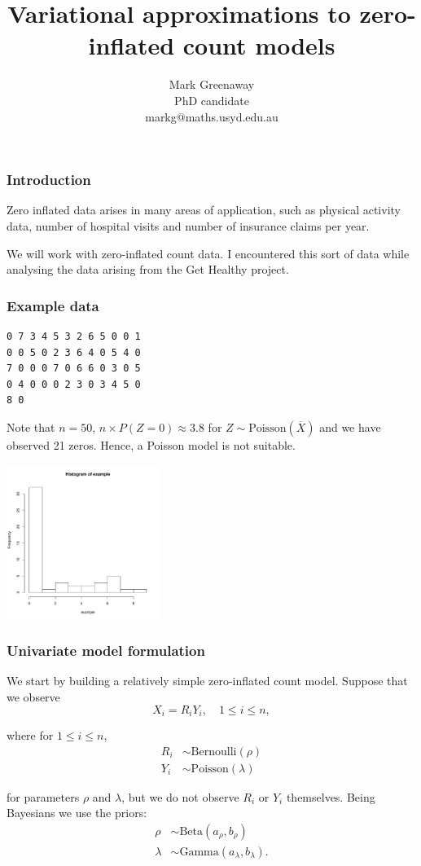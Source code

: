 \documentclass{beamer}
\title{Variational approximations to zero-inflated count models}
\author{Mark Greenaway\\PhD candidate\\markg@maths.usyd.edu.au}
\begin{document}
\begin{frame}
\titlepage
\end{frame}

\begin{frame}
\frametitle{Introduction}
Zero inflated data arises in many areas of application, such as physical
activity data, number of hospital visits and number of insurance claims per
year.

\bigskip 
We will work with zero-inflated count data. I encountered this sort of data while
analysing the data arising from the Get Healthy project.
\end{frame}

\begin{frame}[fragile]
\frametitle{Example data}
\begin{verbatim}
0 7 3 4 5 3 2 6 5 0 0 1
0 0 5 0 2 3 6 4 0 5 4 0
7 0 0 0 7 0 6 6 0 3 0 5
0 4 0 0 0 2 3 0 3 4 5 0
8 0
\end{verbatim}

\noindent Note that $n=50$, 
$n\times P(Z = 0) \approx 3.8$ for $Z\sim\mbox{Poisson}(\overline{X})$
and we have observed 21 zeros. Hence,
a Poisson model is not suitable.

\includegraphics[width=50mm, height=50mm]{code/univariate_data_histogram.pdf}
\end{frame}



\begin{frame}
\frametitle{Univariate model formulation}

We start by building a relatively simple zero-inflated count model. Suppose that we observe
$$
X_i = R_i Y_i, \quad 1\le i\le n,
$$

\noindent where for $1\le i\le n$,
\begin{align*} 
R_i &\sim \text{Bernoulli}(\rho) \\
Y_i &\sim \text{Poisson}(\lambda)
\end{align*}

\noindent for parameters $\rho$ and $\lambda$,
but we do not observe $R_i$ or $Y_i$ themselves.
Being Bayesians we use the priors:
\begin{align*} 
\rho &\sim \text{Beta}(a_\rho, b_\rho) \\
\lambda &\sim \text{Gamma}(a_\lambda, b_\lambda).
\end{align*}

\end{frame}
\end{document}
